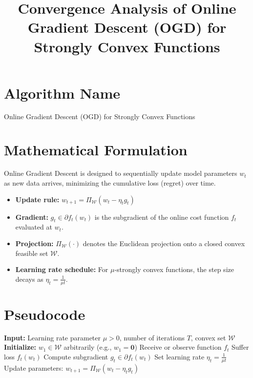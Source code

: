 \documentclass[12pt]{article}
\title{Convergence Analysis of Online Gradient Descent (OGD) for Strongly Convex Functions}
\author{}
\date{}
\begin{document}
\maketitle

\section*{Algorithm Name}
Online Gradient Descent (OGD) for Strongly Convex Functions

\section*{Mathematical Formulation}
Online Gradient Descent is designed to sequentially update model parameters $w_t$ as new data arrives, minimizing the cumulative loss (regret) over time. 
\begin{itemize}
    \item \textbf{Update rule:} $w_{t+1} = \Pi_{\mathcal{W}} \left( w_t - \eta_t g_t \right)$
    \item \textbf{Gradient:} $g_t \in \partial f_t(w_t)$ is the subgradient of the online cost function $f_t$ evaluated at $w_t$.
    \item \textbf{Projection:} $\Pi_{\mathcal{W}}(\cdot)$ denotes the Euclidean projection onto a closed convex feasible set $\mathcal{W}$.
    \item \textbf{Learning rate schedule:} For $\mu$-strongly convex functions, the step size decays as $\eta_t = \frac{1}{\mu t}$.
\end{itemize}

\section*{Pseudocode}
\begin{algorithm}[H]
\caption{Online Gradient Descent (OGD)}
\begin{algorithmic}[1]
\State \textbf{Input:} Learning rate parameter $\mu > 0$, number of iterations $T$, convex set $\mathcal{W}$
\State \textbf{Initialize:} $w_1 \in \mathcal{W}$ arbitrarily (e.g., $w_1 = \mathbf{0}$)
    \State Receive or observe function $f_t$
    \State Suffer loss $f_t(w_t)$
    \State Compute subgradient $g_t \in \partial f_t(w_t)$
    \State Set learning rate $\eta_t = \frac{1}{\mu t}$
    \State Update parameters: $w_{t+1} = \Pi_{\mathcal{W}}(w_t - \eta_t g_t)$
\EndFor
\end{algorithmic}
\end{algorithm}
\end{document}
